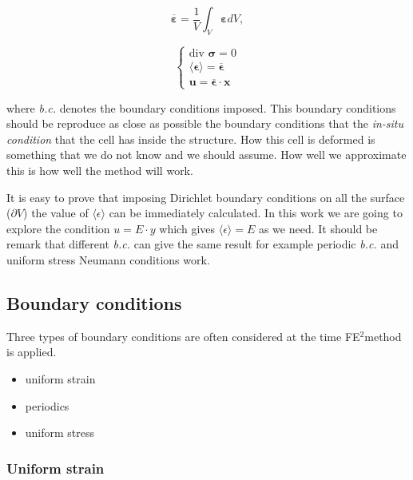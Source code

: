 \documentclass[preprint]{elsarticle}
\newcommand{\fe}{FE$^2$}
\begin{document}
\begin{equation}
\overline{\bm{\varepsilon}} = \frac{1}{V} \int_{V} \bm{\varepsilon} dV,
\label{strain_ave}
\end{equation}

\begin{equation}
\left\{
\begin{array}{ll}
\text{div } \bm{\sigma} = 0 \\
\langle \bm{\epsilon} \rangle =  \overline{\bm{\epsilon}} \\
\bm{u} = \overline{\bm{\epsilon}} \cdot \bm{x}
\end{array}
\right.
\label{micro_eqs}
\end{equation}

\noindent
where \emph{b.c.} denotes the boundary conditions imposed. This boundary
conditions should be reproduce as close as possible the boundary conditions that
the  \emph{in-situ condition} that the cell has inside the structure. How this
cell is deformed is something that we do not know and we should assume. How well
we approximate this is how well the method will work.

It is easy to prove that imposing Dirichlet boundary conditions on all the
surface ($\partial V$) the value of $\langle \epsilon \rangle$ can be
immediately calculated. In this work we are going to explore the condition 
$ u = E \cdot y $ which gives $\langle \epsilon \rangle = E$ as we need. It
should be remark that different \emph{b.c.} can give the same result for example 
periodic \emph{b.c.} and uniform stress Neumann conditions work.

\subsection{Boundary conditions}

Three types of boundary conditions are often considered at the time \fe method is applied. 

\begin{itemize}
\item uniform strain
\item periodics
\item uniform stress
\end{itemize}

\subsubsection{Uniform strain}
\end{document}
